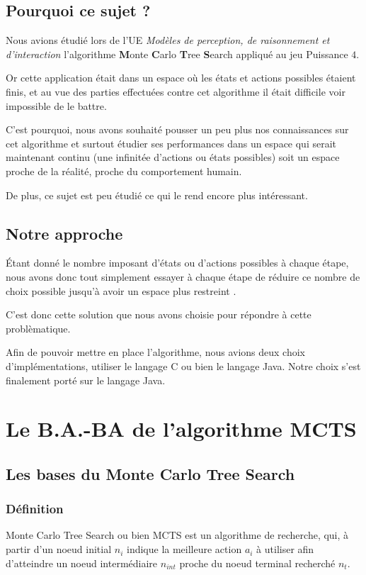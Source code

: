 \documentclass[pdftex,french, english]{article}	%
\begin{document}
	\subsection{Pourquoi ce sujet ?}
	Nous avions étudié lors de l'UE \textit{Modèles de perception, de raisonnement et d’interaction} l'algorithme \textbf{M}onte \textbf{C}arlo \textbf{T}ree \textbf{S}earch \cite{coulom01} appliqué au jeu Puissance $4$. 

	Or cette application était dans un espace où les états et actions possibles étaient finis, et au vue des parties effectuées contre cet algorithme il était difficile voir impossible de le battre. 

	C'est pourquoi, nous avons souhaité pousser un peu plus nos connaissances sur cet algorithme et surtout étudier ses performances dans un espace qui serait maintenant continu (une infinitée d'actions ou états possibles) soit un espace proche de la réalité, proche du comportement humain. 

	De plus, ce sujet est peu étudié ce qui le rend encore plus intéressant.
	
	\subsection{Notre approche}
	Étant donné le nombre imposant d'états ou d'actions possibles à chaque étape, nous avons donc tout simplement essayer à chaque étape de réduire ce nombre de choix possible jusqu'à avoir un espace plus restreint \cite{couetoux01}.

	C'est donc cette solution que nous avons choisie pour répondre à cette problèmatique. 

	Afin de pouvoir mettre en place l'algorithme, nous avions deux choix d'implémentations, utiliser le langage C ou bien le langage Java. Notre choix s'est finalement porté sur le langage Java.
\newpage





\section{Le B.A.-BA de l'algorithme MCTS}
	\subsection{Les bases du Monte Carlo Tree Search}
	\subsubsection{Définition}
	Monte Carlo Tree Search ou bien MCTS est un algorithme de recherche, qui, à partir d'un noeud initial $n_{i}$ indique la meilleure action $a_i$ à utiliser afin d'atteindre un noeud intermédiaire $n_{int}$ proche du noeud terminal recherché $n_{t}$. 
\end{document}
